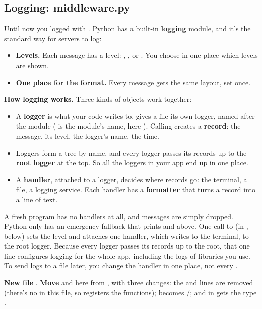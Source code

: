 \subsection{Logging: middleware.py}

Until now you logged with . Python has a built-in \textbf{logging} module, and it's the standard way for servers to log:
\begin{itemize}
\item \textbf{Levels.} Each message has a level: , ,  or . You choose in one place which levels are shown.
\item \textbf{One place for the format.} Every message gets the same layout, set once.
\end{itemize}

\textbf{How logging works.} Three kinds of objects work together:
\begin{itemize}
\item A \textbf{logger} is what your code writes to.  gives a file its own logger, named after the module ( is the module's name, here ). Calling  creates a \textbf{record}: the message, its level, the logger's name, the time.
\item Loggers form a tree by name, and every logger passes its records up to the \textbf{root logger} at the top. So all the loggers in your app end up in one place.
\item A \textbf{handler}, attached to a logger, decides where records go: the terminal, a file, a logging service. Each handler has a \textbf{formatter} that turns a record into a line of text.
\end{itemize}

A fresh program has no handlers at all, and  messages are simply dropped. Python only has an emergency fallback that prints  and above. One call to  (in , below) sets the level and attaches one handler, which writes to the terminal, to the root logger. Because every logger passes its records up to the root, that one line configures logging for the whole app, including the logs of libraries you use. To send logs to a file later, you change the handler in one place, not every .

\textbf{New file} . \textbf{Move}  and  here from , with three changes: the  and  lines are removed (there's no  in this file, so  registers the functions);  becomes /; and  in  gets the type .

